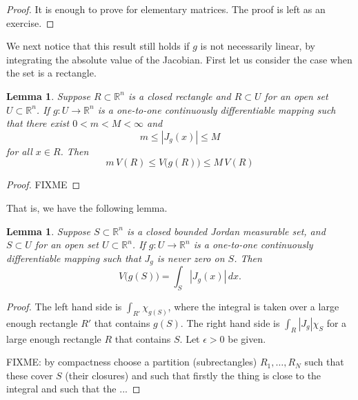 \documentclass[12pt]{book}
\newcommand{\abs}[1]{\left\lvert {#1} \right\rvert}
\newcommand{\R}{{\mathbb{R}}}
\theoremstyle{plain}
\newtheorem{lemma}[thm]{Lemma}
\theoremstyle{remark}
\theoremstyle{definition}
\theoremstyle{exercise}
\theoremstyle{example}
\begin{document}
{\begin{proof}
It is enough to prove for elementary matrices.  The proof is left as an
exercise.
\end{proof}

We next notice that this result still holds if $g$ is not necessarily
linear, by integrating the absolute value of the Jacobian.
First let us consider the case when the set is a rectangle.

\begin{lemma}
Suppose $R \subset \R^n$ is a closed rectangle
and $R \subset U$ for an open set $U \subset \R^n$.  If
$g \colon U \to \R^n$ is a one-to-one
continuously differentiable mapping such that
there exist $0 < m < M < \infty$ and
\begin{equation*}
m \leq \abs{J_g(x)} \leq M
\end{equation*}
for all $x \in R$.
Then
\begin{equation*}
m \, V(R) \leq V\bigl(g(R)\bigr) \leq M \, V(R)
\end{equation*}
\end{lemma}

\begin{proof}
FIXME
\end{proof}


  That is, we have
the following lemma.

\begin{lemma}
Suppose $S \subset \R^n$ is a closed bounded Jordan measurable set,
and $S \subset U$ for an open set $U \subset \R^n$.  If
$g \colon U \to \R^n$ is a one-to-one
continuously differentiable mapping such that
$J_g$ is never zero on $S$.
Then
\begin{equation*}
V\bigl(g(S)\bigr)
=
\int_S \abs{J_g(x)} \, dx .
\end{equation*}
\end{lemma}

\begin{proof}
The left hand side is $\int_{R'} \chi_{g(S)}$, where the integral is taken over a
large enough rectangle $R'$ that contains $g(S)$.
The right hand side is $\int_{R} \abs{J_g} \chi_S$ for
a large enough rectangle $R$ that contains $S$.  Let $\epsilon > 0$ be
given.


FIXME: by compactness choose a partition (subrectangles) $R_1,\ldots,R_N$ such that these cover $S$
(their closures) and such that firstly  the thing is close to the integral
and such that the ...



\end{proof}}
\end{document}
